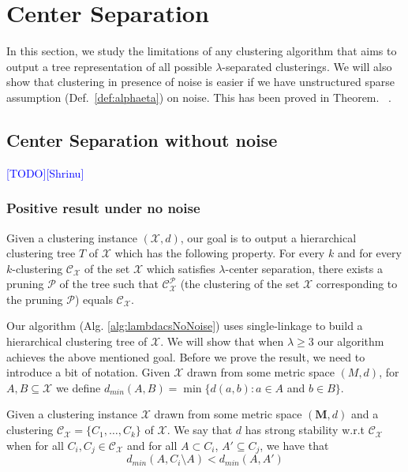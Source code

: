 \documentclass[anon,12pt]{colt2016} %
\newcommand{\mc}{\mathcal}
\newcommand{\mb}{\mathbf}
\newcommand{\todo}{\textcolor{blue}{[TODO]}\xspace}
\newcommand{\shrinu}{\textcolor{blue}{[Shrinu]}\xspace}
\begin{document}

\section{Center Separation}
 In this section, we study the limitations of any clustering algorithm that aims to output a tree representation of all possible {$\lambda$}-separated clusterings. We will also show that clustering in presence of noise is easier if we have unstructured sparse assumption (Def.~\ref{def:alphaeta}) on noise. This has been proved in Theorem.~ .
 
 
 \subsection{Center Separation without noise}
\todo\shrinu


\subsubsection{Positive result under no noise}
Given a clustering instance $(\mc X, d)$, our goal is to output a hierarchical clustering tree $T$ of $\mc X$ which has the following property. For every $k$ and for every $k$-clustering $\mc C_{\mc X}$ of the set $\mc X$ which satisfies $\lambda$-center separation, there exists a pruning $\mc P$ of the tree such that $\mc C_{\mc X}^{\mc P}$ (the clustering of the set $\mc X$ corresponding to the pruning $\mc P$) equals $\mc C_{\mc X}$. 

Our algorithm (Alg. \ref{alg:lambdacsNoNoise}) uses single-linkage to build a hierarchical clustering tree of $\mc X$. We will show that when $\lambda \ge 3$ our algorithm achieves the above mentioned goal. Before we prove the result, we need to introduce a bit of notation. Given $\mc X$ drawn from some metric space $(M, d)$, for $A, B \subseteq \mc X$ we define $d_{min}(A, B) = \min \{d(a, b): a \in A$ and $b \in B\}$.
\begin{definition}
Given a clustering instance $\mc X$ drawn from some metric space $(\mb M, d)$ and a clustering $\mc C_{\mc X} = \{C_1, \ldots, C_k\}$ of $\mc X$. We say that $d$ has strong stability w.r.t $\mc C_{\mc X}$ when for all $C_i, C_j \in \mc C_{\mc X}$ and for all $A \subset C_i$, $A' \subseteq C_j$, we have that 
$$d_{min}(A, C_i\setminus A) < d_{min}(A, A')$$
\end{definition}
\end{document}
